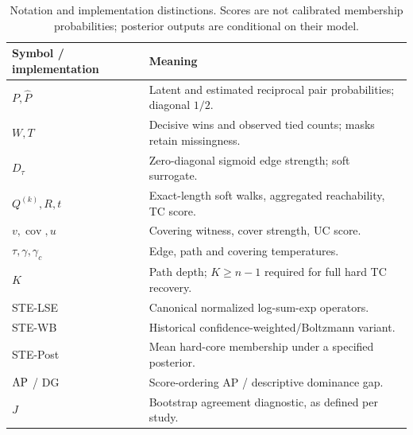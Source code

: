\begin{table}[ht]\centering\small
\begin{tabular}{@{}ll@{}}\toprule
Symbol / implementation & Meaning\\\midrule
$P,\widehat P$ & Latent and estimated reciprocal pair probabilities; diagonal $1/2$.\\
$W,T$ & Decisive wins and observed tied counts; masks retain missingness.\\
$D_\tau$ & Zero-diagonal sigmoid edge strength; soft surrogate.\\
$Q^{(k)},R,t$ & Exact-length soft walks, aggregated reachability, TC score.\\
$v,\operatorname{cov},u$ & Covering witness, cover strength, UC score.\\
$\tau,\gamma,\gamma_c$ & Edge, path and covering temperatures.\\
$K$ & Path depth; $K\ge n-1$ required for full hard TC recovery.\\
STE-LSE & Canonical normalized log-sum-exp operators.\\
STE-WB & Historical confidence-weighted/Boltzmann variant.\\
STE-Post & Mean hard-core membership under a specified posterior.\\
$\operatorname{AP}$ / DG & Score-ordering AP / descriptive dominance gap.\\
$J$ & Bootstrap agreement diagnostic, as defined per study.\\\bottomrule
\end{tabular}
\caption{Notation and implementation distinctions. Scores are not calibrated membership probabilities; posterior outputs are conditional on their model.}
\end{table}

